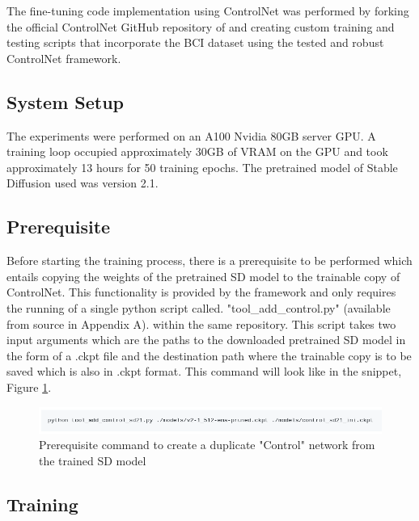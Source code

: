 The fine-tuning code implementation using ControlNet was performed by forking the official ControlNet GitHub repository of \textcite{Zhang2023AddingModels} and creating custom training and testing scripts that incorporate the BCI dataset using the tested and robust ControlNet framework.

\subsection{System Setup}

The experiments were performed on an A100 Nvidia 80GB server GPU. A training loop occupied approximately 30GB of VRAM on the GPU and took approximately 13 hours for 50 training epochs. The pretrained model of Stable Diffusion used was version 2.1.

\subsection{Prerequisite}

Before starting the training process, there is a prerequisite to be performed which entails copying the weights of the pretrained SD model to the trainable copy of ControlNet. This functionality is provided by the framework and only requires the running of  a single python script called. "tool\_add\_control.py" (available from source in Appendix A). within the same repository. This script takes two input arguments which are the paths to the downloaded pretrained SD model in the form of a .ckpt file and the destination path where the trainable copy is to be saved which is also in .ckpt format. This command will look like in the snippet, Figure \ref{fig:copy-sd-control}.
\begin{figure}[h]
    \centering
    \includegraphics[width=1\linewidth]{4_ResearchMethodology/figures/ckpt_copy.png}
    \caption[Prerequisite command to copy weights]{Prerequisite command to create a duplicate "Control" network from the trained SD model \parencite[GitHub: ControlNet/docs/train.md]{Zhang2023AddingModels}}
    \label{fig:copy-sd-control}
\end{figure}

\subsection{Training}


